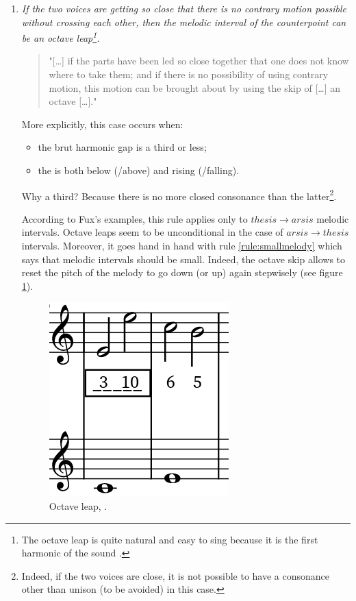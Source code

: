 \begin{enumerate}[wide, label=\bfseries 2.M\arabic*]
    \item\label{rule:octaveleap} \textit{If the two voices are getting so close that there is no contrary motion possible without crossing each other, then the melodic interval of the counterpoint can be an octave leap\footnote{The octave leap is quite natural and easy to sing because it is the first harmonic of the sound \parencite{Octavewiki}.}.} \parencite[p.67-68]{GaPFr}

    \begin{quotation}
        "[\dots] if the parts have been led so close together that one does not know where to take them; and if there is no possibility of using contrary motion, this motion can be brought about by using the skip of [\dots] an octave [\dots]."
        \textcite[p.45]{GaPEng}
    \end{quotation}
    More explicitly, this case occurs when:
    \begin{itemize}
        \item the brut harmonic gap is a third or less;
        \item the \cf is both below (/above) and rising (/falling).
    \end{itemize}
    Why a third? Because there is no more closed consonance than the latter\footnote{Indeed, if the two voices are close, it is not possible to have a consonance other than unison (to be avoided) in this case.}.

    According to Fux's examples, this rule applies only to $thesis\to arsis$ melodic intervals. Octave leaps seem to be unconditional in the case of $arsis\to thesis$ intervals. Moreover, it goes hand in hand with rule \ref{rule:smallmelody} which says that melodic intervals should be small. Indeed, the octave skip allows to reset the pitch of the melody to go down (or up) again stepwisely (see figure \ref{fig:octaveleap}).
    \begin{figure}[h]
        \centering
        \includegraphics[height=\fh]{Images/octave_leap.png}
        \caption{Octave leap, .}
        \label{fig:octaveleap}
    \end{figure}


\end{enumerate}
